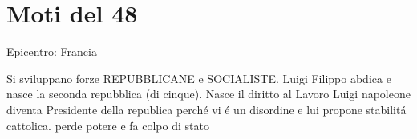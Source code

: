 \documentclass{article}
\title{\jobname}
\author{Eugenio Animali}
\begin{document}
\maketitle

\section{Moti del 48}
Epicentro: Francia

Si sviluppano forze REPUBBLICANE e SOCIALISTE. Luigi Filippo abdica e nasce la seconda repubblica (di cinque). Nasce il diritto al Lavoro Luigi napoleone diventa Presidente della republica perché vi é un disordine e lui propone stabilitá cattolica. perde potere e fa colpo di stato
\end{document}
